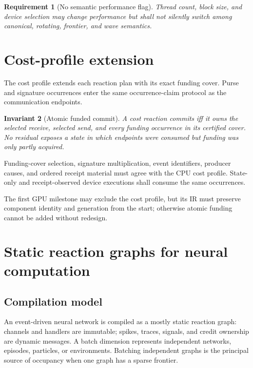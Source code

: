 \documentclass[11pt]{article}
\newtheorem{requirement}{Requirement}[section]
\newtheorem{invariant}[requirement]{Invariant}
\begin{document}
\begin{requirement}[No semantic performance flag]
Thread count, block size, and device selection may change performance but
shall not silently switch among canonical, rotating, frontier, and wave
semantics.
\end{requirement}

\section{Cost-profile extension}

The cost profile extends each reaction plan with its exact funding cover.
Purse and signature occurrences enter the same occurrence-claim protocol as
the communication endpoints.

\begin{invariant}[Atomic funded commit]
A cost reaction commits iff it owns the selected receive, selected send, and
every funding occurrence in its certified cover.  No residual exposes a state
in which endpoints were consumed but funding was only partly acquired.
\end{invariant}

Funding-cover selection, signature multiplication, event identifiers,
producer causes, and ordered receipt material must agree with the CPU cost
profile.  State-only and receipt-observed device executions shall consume the
same occurrences.

The first GPU milestone may exclude the cost profile, but its IR must preserve
component identity and generation from the start; otherwise atomic funding
cannot be added without redesign.

\section{Static reaction graphs for neural computation}

\subsection{Compilation model}

An event-driven neural network is compiled as a mostly static reaction graph:
channels and handlers are immutable; spikes, traces, signals, and credit
ownership are dynamic messages.  A batch dimension represents independent
networks, episodes, particles, or environments.  Batching independent graphs
is the principal source of occupancy when one graph has a sparse frontier.
\end{document}
